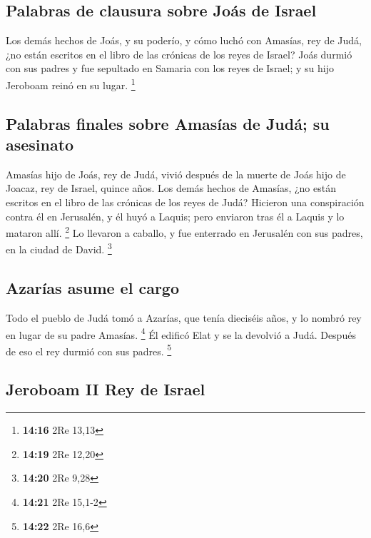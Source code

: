 \begin{paracol}{2}
\hypertarget{palabras-de-clausura-sobre-jouxe1s-de-israel}{%
\subsection{Palabras de clausura sobre Joás de
Israel}\label{palabras-de-clausura-sobre-jouxe1s-de-israel}}

 Los demás hechos de Joás, y su poderío, y cómo luchó con
Amasías, rey de Judá, ¿no están escritos en el libro de las crónicas de
los reyes de Israel?  Joás durmió con sus padres y fue
sepultado en Samaria con los reyes de Israel; y su hijo Jeroboam reinó
en su lugar. \footnote{\textbf{14:16} 2Re 13,13}

\hypertarget{palabras-finales-sobre-amasuxedas-de-juduxe1-su-asesinato}{%
\subsection{Palabras finales sobre Amasías de Judá; su
asesinato}\label{palabras-finales-sobre-amasuxedas-de-juduxe1-su-asesinato}}

 Amasías hijo de Joás, rey de Judá, vivió después de la
muerte de Joás hijo de Joacaz, rey de Israel, quince años.
 Los demás hechos de Amasías, ¿no están escritos en el
libro de las crónicas de los reyes de Judá?  Hicieron una
conspiración contra él en Jerusalén, y él huyó a Laquis; pero enviaron
tras él a Laquis y lo mataron allí. \footnote{\textbf{14:19} 2Re 12,20}
 Lo llevaron a caballo, y fue enterrado en Jerusalén con
sus padres, en la ciudad de David. \footnote{\textbf{14:20} 2Re 9,28}

\hypertarget{azaruxedas-asume-el-cargo}{%
\subsection{Azarías asume el cargo}\label{azaruxedas-asume-el-cargo}}

 Todo el pueblo de Judá tomó a Azarías, que tenía
dieciséis años, y lo nombró rey en lugar de su padre Amasías.
\footnote{\textbf{14:21} 2Re 15,1-2}  Él edificó Elat y
se la devolvió a Judá. Después de eso el rey durmió con sus padres.
\footnote{\textbf{14:22} 2Re 16,6}

\hypertarget{jeroboam-ii-rey-de-israel}{%
\subsection{Jeroboam II Rey de Israel}\label{jeroboam-ii-rey-de-israel}}


\end{paracol}

